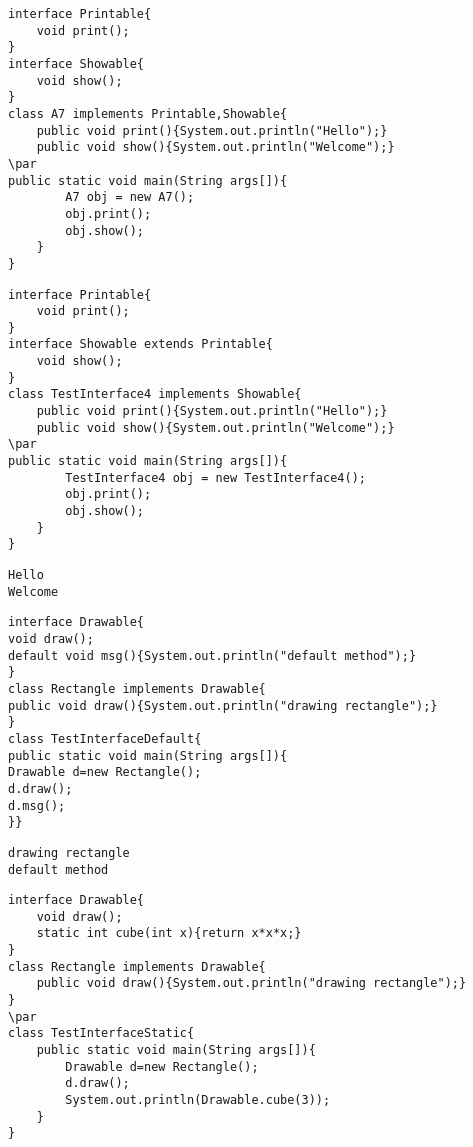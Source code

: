 \documentclass{book}
\def\lthtmlcheckvsize{\ifdim\ht\sizebox<\vsize 
  \ifdim\wd\sizebox<\hsize\expandafter\hfill\fi \expandafter\vfill
  \else\expandafter\vss\fi}%
\begin{document}
{\newpage\clearpage
{}%
\begin{lstlisting}
interface Printable{  
	void print();  
}  
interface Showable{  
	void show();  
}  
class A7 implements Printable,Showable{  
	public void print(){System.out.println("Hello");}  
	public void show(){System.out.println("Welcome");}  
\par
public static void main(String args[]){  
		A7 obj = new A7();  
		obj.print();  
		obj.show();  
	}  
}  
\end{lstlisting}%
\lthtmlfigureZ
\lthtmlcheckvsize\clearpage}

{\newpage\clearpage
{}%
\begin{lstlisting}
interface Printable{  
	void print();  
}  
interface Showable extends Printable{  
	void show();  
}  
class TestInterface4 implements Showable{  
	public void print(){System.out.println("Hello");}  
	public void show(){System.out.println("Welcome");}  
\par
public static void main(String args[]){  
		TestInterface4 obj = new TestInterface4();  
		obj.print();  
		obj.show();  
	}  
}  
\end{lstlisting}%
\lthtmlfigureZ
\lthtmlcheckvsize\clearpage}

{\newpage\clearpage
{}%
\begin{lstlisting}
Hello
Welcome
\end{lstlisting}%
\lthtmlfigureZ
\lthtmlcheckvsize\clearpage}

{\newpage\clearpage
{}%
\begin{lstlisting}
interface Drawable{  
void draw();  
default void msg(){System.out.println("default method");}  
}  
class Rectangle implements Drawable{  
public void draw(){System.out.println("drawing rectangle");}  
}  
class TestInterfaceDefault{  
public static void main(String args[]){  
Drawable d=new Rectangle();  
d.draw();  
d.msg();  
}}  
\end{lstlisting}%
\lthtmlfigureZ
\lthtmlcheckvsize\clearpage}

{\newpage\clearpage
{}%
\begin{lstlisting}
drawing rectangle
default method
\end{lstlisting}%
\lthtmlfigureZ
\lthtmlcheckvsize\clearpage}

{\newpage\clearpage
{}%
\begin{lstlisting}
interface Drawable{  
	void draw();  
	static int cube(int x){return x*x*x;}  
}  
class Rectangle implements Drawable{  
	public void draw(){System.out.println("drawing rectangle");}  
}  
\par
class TestInterfaceStatic{  
	public static void main(String args[]){  
		Drawable d=new Rectangle();  
		d.draw();  
		System.out.println(Drawable.cube(3));  
	}
}  
\end{lstlisting}%
\lthtmlfigureZ
\lthtmlcheckvsize\clearpage}
\end{document}
